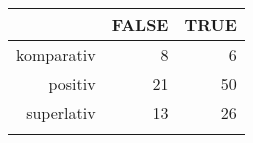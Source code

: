 \begin{tabular}{rrr}
  \lsptoprule
 & FALSE & TRUE \\ 
  \midrule
komparativ & 8 & 6 \\ 
  positiv & 21 & 50 \\ 
  superlativ & 13 & 26 \\ 
   \lspbottomrule
\end{tabular}
